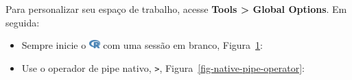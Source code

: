 \documentclass[
  letterpaper,
]{book}
\providecommand{\tightlist}{%
  \setlength{\itemsep}{0pt}\setlength{\parskip}{0pt}}\usepackage{longtable,booktabs,array}
\theoremstyle{plain}
\theoremstyle{definition}
\theoremstyle{remark}
\begin{document}
Para personalizar seu espaço de trabalho, acesse \textbf{Tools
\textgreater{} Global Options}. Em seguida:

\begin{itemize}
\tightlist
\item
  Sempre inicie o
  \includegraphics[width=1.13em,height=1em]{getting_started_with_r_files/figure-pdf/fa-icon-9b00320707d42527dde67262afb33ded.pdf}
  com uma sessão em branco, Figura~\ref{fig-r-blank-slate}:
\end{itemize}

\begin{figure}


\caption{\label{fig-r-blank-slate}}

\end{figure}%

\begin{itemize}
\tightlist
\item
  Use o operador de pipe nativo, \texttt{\textbar{}\textgreater{}},
  Figura~\ref{fig-native-pipe-operator}:
\end{itemize}
\end{document}
